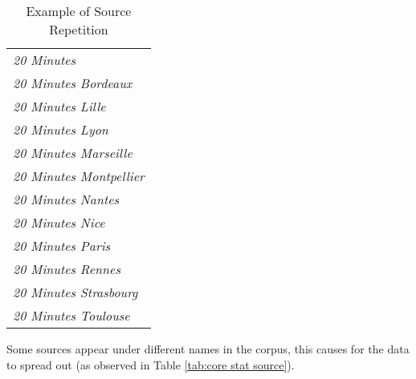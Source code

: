 \begin{table}[H]
\centering
\begin{tabular}{l}
\toprule
\emph{20 Minutes} \\
\emph{20 Minutes Bordeaux} \\
\emph{20 Minutes Lille} \\
\emph{20 Minutes Lyon} \\
\emph{20 Minutes Marseille} \\
\emph{20 Minutes Montpellier} \\
\emph{20 Minutes Nantes} \\
\emph{20 Minutes Nice} \\
\emph{20 Minutes Paris} \\
\emph{20 Minutes Rennes} \\
\emph{20 Minutes Strasbourg} \\
\emph{20 Minutes Toulouse} \\
\bottomrule
\end{tabular}
\caption{Example of Source Repetition}
\label{tab:source repetition}
Some sources appear under different names in the corpus, this causes for the data to spread out (as observed in Table \ref{tab:core stat source}).
\end{table}

